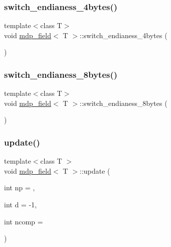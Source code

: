 \mbox{\label{classmdp__field_ac9f44455cd31baa03e00ca5b601f199c}} 
\subsubsection{\texorpdfstring{switch\+\_\+endianess\+\_\+4bytes()}{switch\_endianess\_4bytes()}}
{\footnotesize\ttfamily template$<$class T$>$ \\
void \hyperlink{classmdp__field}{mdp\+\_\+field}$<$ T $>$\+::switch\+\_\+endianess\+\_\+4bytes (\begin{DoxyParamCaption}{ }\end{DoxyParamCaption})\hspace{0.3cm}{\ttfamily [inline]}}

\mbox{\label{classmdp__field_a8db821b09a101730bcbcf27ccd1a25f5}} 
\subsubsection{\texorpdfstring{switch\+\_\+endianess\+\_\+8bytes()}{switch\_endianess\_8bytes()}}
{\footnotesize\ttfamily template$<$class T$>$ \\
void \hyperlink{classmdp__field}{mdp\+\_\+field}$<$ T $>$\+::switch\+\_\+endianess\+\_\+8bytes (\begin{DoxyParamCaption}{ }\end{DoxyParamCaption})\hspace{0.3cm}{\ttfamily [inline]}}

\mbox{\label{classmdp__field_a72b973da706841ea58dc728345d36795}} 
\subsubsection{\texorpdfstring{update()}{update()}}
{\footnotesize\ttfamily template$<$class T $>$ \\
void \hyperlink{classmdp__field}{mdp\+\_\+field}$<$ T $>$\+::update (\begin{DoxyParamCaption}\item[{int}]{np = {},  }\item[{int}]{d = {\ttfamily -\/1},  }\item[{int}]{ncomp = {} }\end{DoxyParamCaption})}

